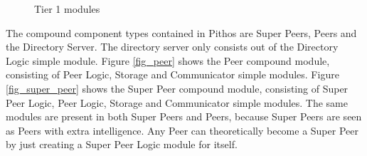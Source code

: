 \documentclass[10pt,a4paper,conference]{IEEEtran}
\begin{document}
\begin{figure}[htbp]
\centering {}
\caption{Tier 1 modules}
\end{figure}

The compound component types contained in Pithos are Super Peers, Peers and the Directory Server. The directory server only consists out of the
Directory Logic simple module. Figure \ref{fig_peer} shows the Peer compound module, consisting of Peer Logic, Storage and Communicator simple
modules. Figure \ref{fig_super_peer} shows the Super Peer compound module, consisting of Super Peer Logic, Peer Logic, Storage and Communicator
simple modules. The same modules are present in both Super Peers and Peers, because Super Peers are seen as Peers with extra intelligence. Any Peer
can theoretically become a Super Peer by just creating a Super Peer Logic module for itself.
\end{document}

